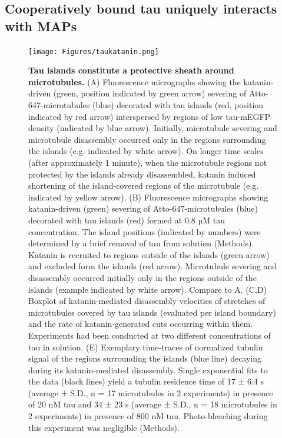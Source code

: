 \subsection{Cooperatively bound tau uniquely interacts with MAPs}
\begin{figure}[h!]
\centering
\texttt{[image: Figures/taukatanin.png]}
\caption[Tau islands constitute a protective sheath around microtubules.]{
\textbf{Tau islands constitute a protective sheath around microtubules.} (A) Fluorescence micrographs showing the katanin-driven (green, position indicated by green arrow) severing of Atto-647-microtubules (blue) decorated with tau islands (red, position indicated by red arrow) interspersed by regions of low tau-mEGFP density (indicated by blue arrow). Initially, microtubule severing and microtubule disassembly occurred only in the regions surrounding the islands (e.g. indicated by white arrow). On longer time scales (after approximately 1 minute), when the microtubule regions not protected by the islands already disassembled, katanin induced shortening of the island-covered regions of the microtubule (e.g. indicated by yellow arrow). (B) Fluorescence micrographs showing katanin-driven (green) severing of Atto-647-microtubules (blue) decorated with tau islands (red) formed at 0.8 µM tau concentration. The island positions (indicated by numbers) were determined by a brief removal of tau from solution (Methods). Katanin is recruited to regions outside of the islands (green arrow) and excluded form the islands (red arrow). Microtubule severing and disassembly occurred initially only in the regions outside of the islands (example indicated by white arrow). Compare to A. (C,D) Boxplot of katanin-mediated disassembly velocities of stretches of microtubules covered by tau islands (evaluated per island boundary) and the rate of katanin-generated cuts occurring within them. Experiments had been conducted at two different concentrations of tau in solution. (E) Exemplary time-traces of normalized tubulin signal of the regions surrounding the islands (blue line) decaying during its katanin-mediated disassembly. Single exponential fits to the data (black lines) yield a tubulin residence time of 17 ± 6.4 s (average ± S.D., n = 17 microtubules in 2 experiments) in presence of 20 nM tau and 34 ± 23 s (average ± S.D., n = 18 microtubules in 2 experiments) in presence of 800 nM tau. Photo-bleaching during this experiment was negligible (Methods).
	}\label{taukatanin}
\end{figure}
